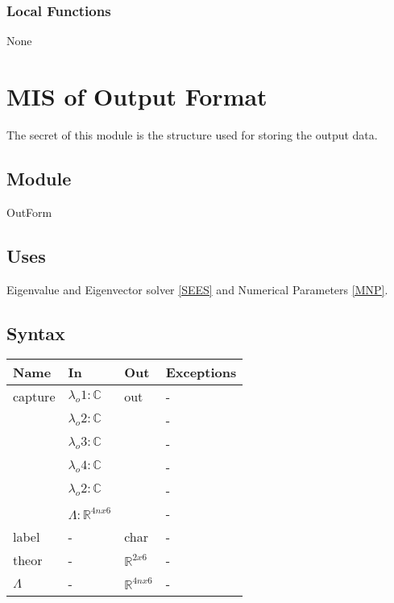 \documentclass[12pt, titlepage]{article}
\begin{document}
\subsubsection{Local Functions}
None
\newpage

\section{MIS of Output Format} \label{OFM}

The secret of this module is the structure used for storing the output data.

\subsection{Module}

OutForm

\subsection{Uses}

Eigenvalue and Eigenvector solver \ref{SEES} and Numerical 
Parameters \ref{MNP}. 

\subsection{Syntax} 

\begin{center}
	\begin{tabular}{p{3cm} p{3cm} p{3cm} >{\raggedright\arraybackslash}p{7cm}}
		\toprule
		\textbf{Name} & \textbf{In} & \textbf{Out} & \textbf{Exceptions}  \\
		\hline
		capture & $\lambda_{o}1 :\mathbb{C}$ & out & - \\ 
		 & $\lambda_{o}2 :\mathbb{C}$ &  & - \\ 
		 & $\lambda_{o}3 :\mathbb{C}$ &  & - \\
		 & $\lambda_{o}4 :\mathbb{C}$ &  & - \\
		 & $\lambda_{o}2 :\mathbb{C}$ &  & - \\ 
		 & $\Lambda : \mathbb{R}^{4n x 6}$ & & -\\
		label & - & char & - \\ 
		theor & - & $\mathbb{R}^{2 x 6}$ & - \\
		$\Lambda$ & - & $\mathbb{R}^{4n x 6}$ & - \\
		\hline
	\end{tabular}
\end{center}
\end{document}
